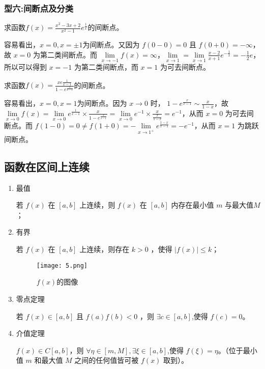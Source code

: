           \subsubsection*{型六:间断点及分类}
          \begin{example}
              求函数$ f(x) =\displaystyle\frac{x^2-3x+2}{x^2-1}e^{\frac{1}{x}}$的间断点。
          \end{example}

          \begin{solution}
              容易看出，$ x=0, x=\pm 1$为间断点。又因为 $f(0-0)=0$ 且 $f(0+0)=-\infty$，故 $x=0$ 为第二类间断点。而 $\lim\limits_{x\to -1}f(x)=\infty$，$\lim\limits_{x \to 1} = \lim\limits_{x \to 1}\frac{x-2}{x+1}e^{-\frac{1}{x}}=-\frac{1}{2}e$，所以可以得到 $x=-1$ 为第二类间断点，而 $x=1$ 为可去间断点。
          \end{solution}
   
          \begin{example}
            求函数$ f(x) =\displaystyle\frac{x e\frac{1}{x-1}}{1-e^{\frac{x}{x-1}}}$的间断点。
        \end{example}

        \begin{solution}
            容易看出，$ x=0, x=1$为间断点。因为 $x \to 0$ 时，  $1-e^{\frac{x}{x-1}} \sim \displaystyle\frac{x}{1-x}$，故 $\lim\limits_{x \to 0}f(x) = \lim\limits_{x \to 0}e^{\frac{1}{x-1}}\times \displaystyle\frac{x}{1-e^{\frac{x}{x-1}}}=\lim\limits_{x\to 0}e^{-1}\times\displaystyle\frac{x}{\frac{x}{1-x}}=e^{-1}$，从而 $x=0$ 为可去间断点。而 $f(1-0)=0 \neq f(1+0)=-\lim\limits_{x\to 1^+}e^{\frac{1-x}{x-1}}=-e^{-1}$，从而 $x=1$ 为跳跃间断点。
        \end{solution}

        \subsection{函数在区间上连续}
        \begin{enumerate}
            \item 最值
            
            若 $f(x)$ 在 $[a,b]$ 上连续，则 $f(x)$ 在 $[a,b]$ 内存在最小值 $m$ 与最大值$M$；
            \item 有界
            
            若 $f(x)$ 在 $[a,b]$ 上连续，则存在 $k>0$ ，使得 $|f(x)|\leq k$；
        \begin{figure}[htbp]
            \centering
            \texttt{[image: 5.png]}
            \caption{$f(x)$的图像}
          \end{figure}

          \item 零点定理
          
          若 $f(x) \in [a,b]$ 且 $f(a)f(b)<0$ ，则 $\exists c\in [a,b]$,使得 $f(c)=0$。
          \item 介值定理
           
          $f(x) \in C[a,b] $，则 $\forall \eta \in [m,M],\exists \xi \in [a,b]$,使得 $f(\xi)=\eta $。（位于最小值 $m$ 和最大值 $M$ 之间的任何值皆可被 $f(x)$ 取到）。
        \end{enumerate}

